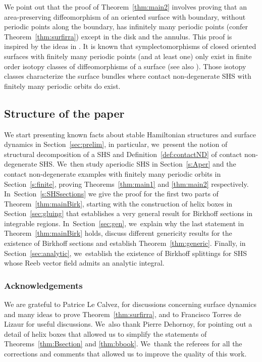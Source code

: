 \documentclass[JEP,XML,SOM,Unicode,NoEqCountersInSection,NoFloatCountersInSection,published]{cedram}
\theoremstyle{definition}
\begin{document}
We point out that the proof of Theorem~\ref{thm:main2} involves proving that an area-preserving diffeomorphism of an oriented surface with boundary, without periodic points along the boundary, has infinitely many periodic points (confer Theorem~\ref{thm:surfirra}) except in the disk and the annulus. This proof is inspired by the ideas in \cite{Lec1}. It is known that symplectomorphisms of closed oriented surfaces with finitely many periodic points (and at least one) only exist in finite order isotopy classes of diffeomorphisms of a surface \cite[Ths.\,1.2 \&\,1.3]{Lec1} (see also \cite{AZT}). Those isotopy classes characterize the surface bundles where contact non-degenerate SHS with finitely many periodic orbits do exist.

\subsection{Structure of the paper} We start presenting known facts about stable Hamiltonian structures and surface dynamics in Section~\ref{sec:prelim}, in particular, we~present the notion of structural decomposition of a SHS and Definition~\ref{def:contactND} of contact non-degenerate SHS. We~then study aperiodic SHS in Section~\ref{s:Aper} and the contact non-degenerate examples with finitely many periodic orbits in Section~\ref{s:finite}, proving Theorems~\ref{thm:main1} and \ref{thm:main2} respectively. In~Section~\ref{s:SHSsections} we give the proof for the first two parts of Theorem~\ref{thm:mainBirk}, starting with the construction of helix boxes in Section~\ref{sec:gluing} that establishes a very general result for Birkhoff sections in integrable regions. In~Section~\ref{sec:gen}, we~explain why the last statement in Theorem~\ref{thm:mainBirk} holds, discuss different genericity results for the existence of Birkhoff sections and establish Theorem~\ref{thm:generic}. Finally, in Section~\ref{sec:analytic}, we~establish the existence of Birkhoff splittings for SHS whose Reeb vector field admits an analytic integral.

\subsubsection*{Acknowledgements}
We are grateful to Patrice Le Calvez, for discussions concerning surface dynamics and many ideas to prove Theorem~\ref{thm:surfirra}, and to Francisco Torres de Lizaur for useful discussions. We~also thank Pierre Dehornoy, for pointing out a detail of helix boxes that allowed us to simplify the statements of Theorems~\ref{thm:Bsection} and \ref{thm:bbook}. We~thank the referees for all the corrections and comments that allowed us to improve the quality of this work.
\end{document}
